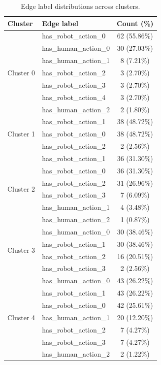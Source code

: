 \documentclass[letterpaper, 10 pt, conference]{ieeeconf}  %
\begin{document}
\begin{table}[tb]
    \centering
    \renewcommand{\arraystretch}{1.2}
    \setlength{\tabcolsep}{8pt}
    \begin{tabular}{llc}
        \toprule
        \textbf{Cluster} & \textbf{Edge label} & \textbf{Count (\%)} \\
        \midrule
        \multirow{7}{*}{Cluster 0} 
        & has\_robot\_action\_0 & 62 (55.86\%) \\
        & has\_human\_action\_0 & 30 (27.03\%) \\
        & has\_human\_action\_1 & 8 (7.21\%) \\
        & has\_robot\_action\_2 & 3 (2.70\%) \\
        & has\_robot\_action\_3 & 3 (2.70\%) \\
        & has\_robot\_action\_4 & 3 (2.70\%) \\
        & has\_human\_action\_2 & 2 (1.80\%) \\
        \midrule
        \multirow{3}{*}{Cluster 1} 
        & has\_robot\_action\_1 & 38 (48.72\%) \\
        & has\_robot\_action\_0 & 38 (48.72\%) \\
        & has\_robot\_action\_2 & 2 (2.56\%) \\
        \midrule
        \multirow{6}{*}{Cluster 2} 
        & has\_robot\_action\_1 & 36 (31.30\%) \\
        & has\_robot\_action\_0 & 36 (31.30\%) \\
        & has\_robot\_action\_2 & 31 (26.96\%) \\
        & has\_robot\_action\_3 & 7 (6.09\%) \\
        & has\_human\_action\_1 & 4 (3.48\%) \\
        & has\_human\_action\_2 & 1 (0.87\%) \\
        \midrule
        \multirow{4}{*}{Cluster 3} 
        & has\_human\_action\_0 & 30 (38.46\%) \\
        & has\_robot\_action\_1 & 30 (38.46\%) \\
        & has\_robot\_action\_2 & 16 (20.51\%) \\
        & has\_robot\_action\_3 & 2 (2.56\%) \\
        \midrule
        \multirow{7}{*}{Cluster 4} 
        & has\_human\_action\_0 & 43 (26.22\%) \\
        & has\_robot\_action\_1 & 43 (26.22\%) \\
        & has\_robot\_action\_0 & 42 (25.61\%) \\
        & has\_human\_action\_1 & 20 (12.20\%) \\
        & has\_robot\_action\_2 & 7 (4.27\%) \\
        & has\_robot\_action\_3 & 7 (4.27\%) \\
        & has\_human\_action\_2 & 2 (1.22\%) \\
        \bottomrule
    \end{tabular}
    \caption{Edge label distributions across clusters.}
    \label{tab:cluster_edges}
\end{table}
\end{document}
